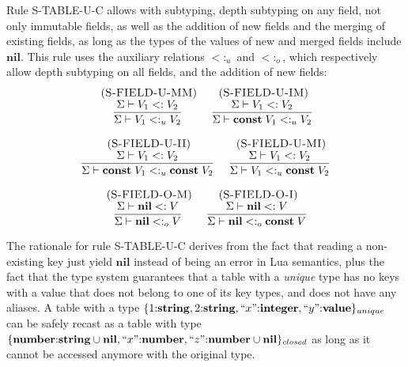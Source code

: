 \documentclass{sigplanconf}
\newcommand{\Value}{\mathbf{value}}
\newcommand{\Nil}{\mathbf{nil}}
\newcommand{\Integer}{\mathbf{integer}}
\newcommand{\Number}{\mathbf{number}}
\newcommand{\String}{\mathbf{string}}
\newcommand{\Const}{\mathbf{const}}
\newcommand{\mylabel}[1]{\; (\textsc{#1})}
\newcommand{\senv}{\Sigma}
\newcommand{\subtype}{<:}
\begin{document}
Rule {\sc S-TABLE-U-C} allows with subtyping, depth subtyping
on any field, not only immutable fields, as well as the addition
of new fields and the merging of existing fields, as long as the types of the values of new and merged fields include $\Nil$.
This rule uses the auxiliary relations $\subtype_{u}$ and $\subtype_{o}$, which respectively allow depth subtyping on all fields, and the addition of new fields:
\[
\begin{array}{c}
\begin{array}{c}
\mylabel{S-FIELD-U-MM}\\
\dfrac{\senv \vdash V_{1} \subtype V_{2}}
      {\senv \vdash V_{1} \subtype_{u} V_{2}}
\end{array}
\;
\begin{array}{c}
\mylabel{S-FIELD-U-IM}\\
\dfrac{\senv \vdash V_{1} \subtype V_{2}}
{\senv \vdash \Const \; V_{1} \subtype_{u} V_{2}}
\end{array}
\\ \\
\begin{array}{c}
\mylabel{S-FIELD-U-II}\\
\dfrac{\senv \vdash V_{1} \subtype V_{2}}
      {\senv \vdash \Const \; V_{1} \subtype_{u} \Const \; V_{2}}
\end{array}
\;
\begin{array}{c}
\mylabel{S-FIELD-U-MI}\\
\dfrac{\senv \vdash V_{1} \subtype V_{2}}
      {\senv \vdash V_{1} \subtype_{u} \Const \; V_{2}}
\end{array}
\\ \\
\begin{array}{c}
\mylabel{S-FIELD-O-M}\\
\dfrac{\senv \vdash \Nil \subtype V}
      {\senv \vdash \Nil \subtype_{o} V}
\end{array}
\;
\begin{array}{c}
\mylabel{S-FIELD-O-I}\\
\dfrac{\senv \vdash \Nil \subtype V}
      {\senv \vdash \Nil \subtype_{o} \Const \; V}
\end{array}
\end{array}
\]

The rationale for rule {\sc S-TABLE-U-C} derives from the
fact that reading a non-existing key just yield $\Nil$
instead of being an error in Lua semantics, plus the fact
that the type system guarantees that a table with a
{\em unique} type has no keys with a value that does not
belong to one of its key types, and does not have any
aliases. A table with a type $\{1{:}\String, 2{:}\String,
``x"{:}\Integer, ``y"{:}\Value\}_{unique}$ can be safely recast as a
table with type 
$\{\Number{:}\String \cup \Nil, ``x"{:}\Number, ``z"{:}
\Number \cup \Nil\}_{closed}$ as long as it cannot be
accessed anymore with the original type.
\end{document}
